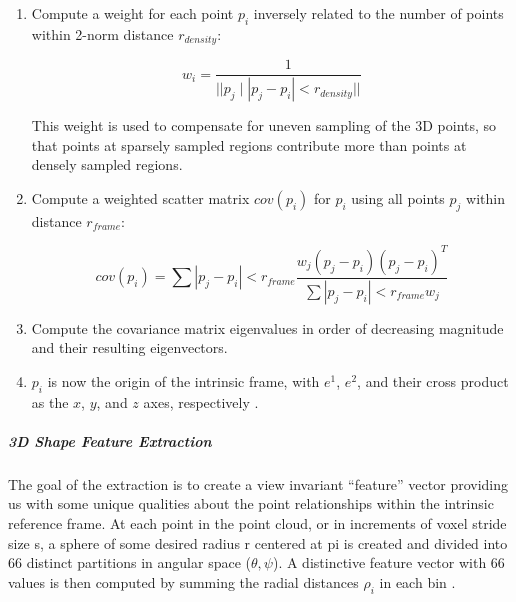 \documentclass[12pt]{drexelthesis}
\begin{document}
\begin{enumerate}
	\item Compute a weight for each point $p_{i}$ inversely related to the number of points within 2-norm distance $r_{density}$:
	
		\begin{equation}
		w_{i}=  \frac{1}{||p_{j} \mid |p_{j}-p_{i}| < r_{density}||}
		\end{equation}

		This weight is used to compensate for uneven sampling of the 3D points, so that points at sparsely sampled regions contribute more than points at densely sampled regions. 

	\item Compute a weighted scatter matrix $cov(p_{i})$ for $p_{i}$ using all points $p_{j}$ within distance $r_{frame}$:
	
		\begin{equation}
		cov(p_{i})= \sum{|p_{j}-p_{i}| < r_{frame}}\frac{w_{j}(p_{j}-p_{i})(p_{j}-p_{i})^{T}}{ \sum{|p_{j}-p_{i}| < r_{frame}}w_{j}}
		\end{equation}
		
	\item Compute the covariance matrix eigenvalues in order of decreasing magnitude and their resulting eigenvectors.
	\item $p_{i}$ is now the origin of the intrinsic frame, with $e^{1}$, $e^{2}$, and their cross product as the $x$, $y$, and $z$ axes, respectively \cite{RN60}.
\end{enumerate}

\subparagraph{3D Shape Feature Extraction}
The goal of the extraction is to create a view invariant “feature” vector providing us with some unique qualities about the point relationships within the intrinsic reference frame. At each point in the point cloud, or in increments of voxel stride size s, a sphere of some desired radius r centered at pi is created and divided into 66 distinct partitions in angular space ($\theta, \psi$). A distinctive feature vector with 66 values is then computed by summing the radial distances $\rho_{i}$ in each bin \cite{RN60}.
\end{document}
